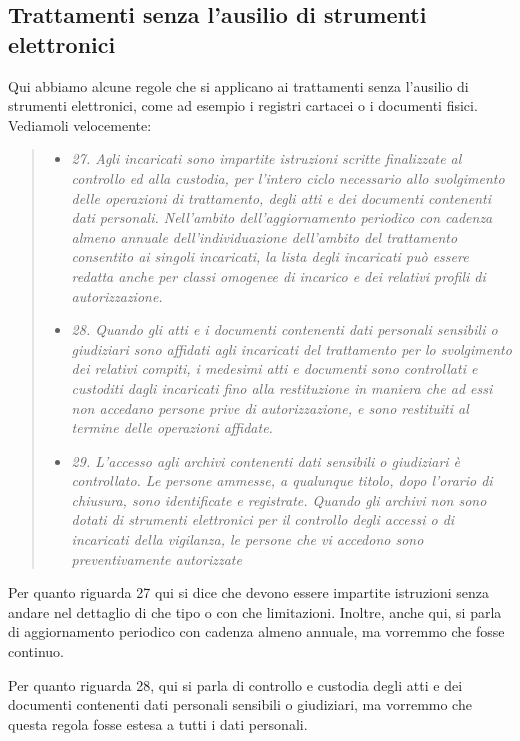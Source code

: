 \subsection{Trattamenti senza l'ausilio di strumenti elettronici}
Qui abbiamo alcune regole che si applicano ai trattamenti senza l'ausilio di strumenti elettronici, come ad esempio i registri cartacei o i documenti fisici. Vediamoli velocemente:
\begin{quote}
    \begin{itemize}
        \item \textit{27. Agli incaricati sono impartite istruzioni scritte finalizzate al controllo ed alla custodia, per l'intero ciclo necessario allo svolgimento delle operazioni di trattamento, degli atti e dei documenti contenenti dati personali. Nell'ambito dell'aggiornamento periodico con cadenza almeno annuale dell'individuazione dell'ambito del trattamento consentito ai singoli incaricati, la lista degli incaricati può essere redatta anche per classi omogenee di incarico e dei relativi profili di autorizzazione.}
        \item \textit{28. Quando gli atti e i documenti contenenti dati personali sensibili o giudiziari sono affidati agli incaricati del trattamento per lo svolgimento dei relativi compiti, i medesimi atti e documenti sono controllati e custoditi dagli incaricati fino alla restituzione in maniera che ad essi non accedano persone prive di autorizzazione, e sono restituiti al termine delle operazioni affidate.}
        \item \textit{29. L'accesso agli archivi contenenti dati sensibili o giudiziari è controllato. Le persone ammesse, a qualunque titolo, dopo l'orario di chiusura, sono identificate e registrate. Quando gli archivi non sono dotati di strumenti elettronici per il controllo degli accessi o di incaricati della vigilanza, le persone che vi accedono sono preventivamente autorizzate}
    \end{itemize}
\end{quote}
Per quanto riguarda 27 qui si dice che devono essere impartite istruzioni senza andare nel dettaglio di che tipo o con che limitazioni. Inoltre, anche qui, si parla di aggiornamento periodico con cadenza almeno annuale, ma vorremmo che fosse continuo.

Per quanto riguarda 28, qui si parla di controllo e custodia degli atti e dei documenti contenenti dati personali sensibili o giudiziari, ma vorremmo che questa regola fosse estesa a tutti i dati personali.

